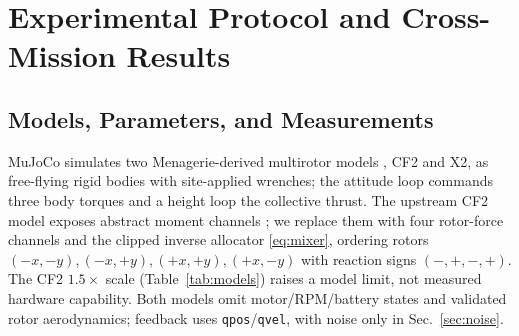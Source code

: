 \documentclass[letterpaper, 10 pt, conference]{ieeeconf}
\begin{document}
\section{Experimental Protocol and Cross-Mission Results}
\label{sec:results}
\subsection{Models, Parameters, and Measurements}

MuJoCo \cite{todorov2012mujoco} simulates two Menagerie-derived multirotor models \cite{menagerieModels}, CF2 and X2, as free-flying rigid bodies with site-applied wrenches; the attitude loop commands three body torques and a height loop the collective thrust. The upstream CF2 model exposes abstract moment channels \cite{menagerieCF2}; we replace them with four rotor-force channels and the clipped inverse allocator \eqref{eq:mixer}, ordering rotors $(-x,-y),(-x,+y),(+x,+y),(+x,-y)$ with reaction signs $(-,+,-,+)$. The CF2 $1.5\times$ scale (Table~\ref{tab:models}) raises a model limit, not measured hardware capability. Both models omit motor/RPM/battery states and validated rotor aerodynamics; feedback uses \texttt{qpos}/\texttt{qvel}, with noise only in Sec.~\ref{sec:noise}.
\end{document}

